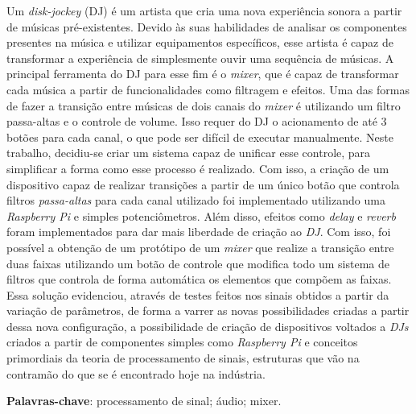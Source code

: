 \begin{resumo}

    Um \textit{disk-jockey} (DJ) é um artista que cria uma nova experiência sonora a partir de músicas pré-existentes. Devido às suas habilidades de analisar os componentes presentes na música e utilizar equipamentos específicos, esse artista é capaz de transformar a experiência de simplesmente ouvir uma sequência de músicas.
    A principal ferramenta do DJ para esse fim é o \textit{mixer}, que é capaz de transformar cada música a partir de funcionalidades como filtragem e efeitos.
    Uma das formas de fazer a transição entre músicas de dois canais do \textit{mixer} é utilizando um filtro passa-altas e o controle de volume. Isso requer do DJ o acionamento de até 3 botões para cada canal, o que pode ser difícil de executar manualmente. Neste trabalho, decidiu-se criar um sistema capaz de unificar esse controle, para simplificar a forma como esse processo é realizado.
    Com isso, a criação de um dispositivo capaz de realizar transições a partir de um único botão que controla filtros \textit{passa-altas} para cada canal utilizado foi implementado utilizando uma \textit{Raspberry Pi} e simples potenciômetros. Além disso, efeitos como \textit{delay} e \textit{reverb} foram implementados para dar mais liberdade de criação ao \textit{DJ}.
    Com isso, foi possível a obtenção de um protótipo de um \textit{mixer} que realize a transição entre duas faixas utilizando um botão de controle que modifica todo um sistema de filtros que controla de forma automática os elementos que compõem as faixas.
    Essa solução evidenciou, através de testes feitos nos sinais obtidos a partir da variação de parâmetros, de forma a varrer as novas possibilidades criadas a partir dessa nova configuração, a possibilidade de criação de dispositivos voltados a \textit{DJs} criados a partir de componentes simples como \textit{Raspberry Pi} e conceitos primordiais da teoria de processamento de sinais, estruturas que vão na contramão do que se é encontrado hoje na indústria.


 \vspace{\onelineskip}
    
 \noindent
 \textbf{Palavras-chave}: processamento de sinal; áudio; mixer.
\end{resumo}
